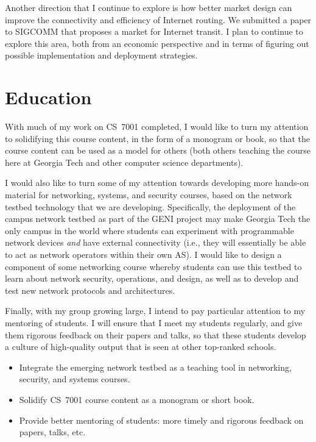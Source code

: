 \begin{sloppypar}
Another direction that I continue to explore is how better market design
can improve the connectivity and efficiency of Internet routing.  We
submitted a paper to SIGCOMM that proposes a market for Internet
transit.  I plan to continue to explore this area, both from an economic
perspective and in terms of figuring out possible implementation and
deployment strategies.  


\section*{Education}


With much of my work on CS~7001 completed, I would like to turn my
attention to solidifying this course content, in the form of a monogram
or book, so that the course content can be used as a model for others
(both others teaching the course here at Georgia Tech and other
computer science departments).   

I would also like to turn some of my attention towards developing more
hands-on material for networking, systems, and security courses, based
on the network testbed technology that we are developing.  Specifically,
the deployment of the campus network testbed as part of the GENI project
may make Georgia Tech the only campus in the world where students can
experiment with programmable network devices {\em and} have external
connectivity (i.e., they will essentially be able to act as network
operators within their own AS).  I would like to design a component of
some networking course whereby students can use this testbed to learn
about network security, operations, and design, as well as to develop
and test new network protocols and architectures.  

Finally, with my group growing large, I intend to pay particular
attention to my mentoring of students.  I will ensure that I meet my
students regularly, and give them rigorous feedback on their papers and
talks, so that these students develop a culture of high-quality output
that is seen at other top-ranked schools.

\begin{itemize}
\itemsep=-1pt
\item Integrate the emerging network testbed as a teaching tool in
networking, security, and systems courses. 
\item Solidify CS~7001 course content as a monogram or short book.
\item Provide better mentoring of students: more timely and rigorous
feedback on papers, talks, etc. 
\end{itemize}


\end{sloppypar}
